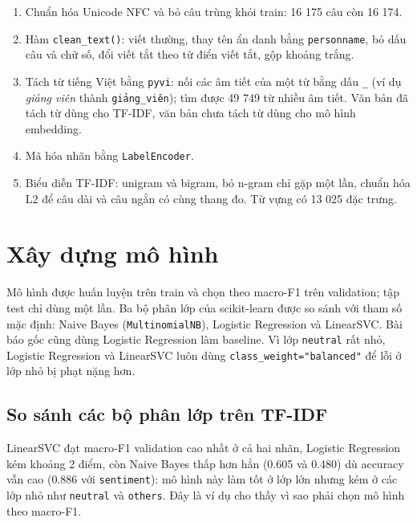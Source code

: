 \begin{enumerate}
  \item Chuẩn hóa Unicode NFC và bỏ câu trùng khỏi train: 16 175 câu còn 16 174.
  \item Hàm \texttt{clean\_text()}: viết thường, thay tên ẩn danh bằng \texttt{personname}, bỏ dấu câu và chữ số, đổi
        viết tắt theo từ điển viết tắt, gộp khoảng trắng.
  \item Tách từ tiếng Việt bằng \texttt{pyvi}: nối các âm tiết của một từ bằng dấu \texttt{\_} (ví dụ \textit{giảng
        viên} thành \texttt{giảng\_viên}); tìm được 49 749 từ nhiều âm tiết. Văn bản đã tách từ dùng cho TF-IDF, văn bản
        chưa tách từ dùng cho mô hình embedding.
  \item Mã hóa nhãn bằng \texttt{LabelEncoder}.
  \item Biểu diễn TF-IDF: unigram và bigram, bỏ n-gram chỉ gặp một lần, chuẩn hóa L2 để câu dài và câu ngắn có cùng thang
        đo. Từ vựng có 13 025 đặc trưng.
\end{enumerate}

\section{Xây dựng mô hình}

Mô hình được huấn luyện trên train và chọn theo macro-F1 trên validation; tập test chỉ dùng một lần. Ba bộ phân lớp của
scikit-learn được so sánh với tham số mặc định: Naive Bayes (\texttt{MultinomialNB}), Logistic Regression và LinearSVC.
Bài báo gốc cũng dùng Logistic Regression làm baseline. Vì lớp
\texttt{neutral} rất nhỏ, Logistic Regression và LinearSVC luôn dùng \texttt{class\_weight="balanced"} để lỗi ở lớp
nhỏ bị phạt nặng hơn.

\subsection{So sánh các bộ phân lớp trên TF-IDF}


LinearSVC đạt macro-F1 validation cao nhất ở cả hai nhãn, Logistic Regression kém khoảng 2 điểm, còn Naive Bayes thấp
hơn hẳn (0.605 và 0.480) dù accuracy vẫn cao (0.886 với \texttt{sentiment}): mô hình này làm tốt ở lớp lớn nhưng kém ở các
lớp nhỏ như \texttt{neutral} và \texttt{others}. Đây là ví dụ cho thấy vì sao phải chọn mô hình theo macro-F1.

